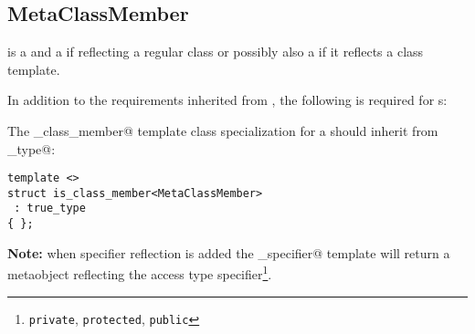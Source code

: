 \subsection{MetaClassMember}
\label{concept-MetaClassMember}

 is a  and a  if reflecting a regular class or possibly
also a  if it reflects a class template.

In addition to the requirements inherited from ,
the following is required for s:

The \verb@is_class_member@ template class specialization for a  should
inherit from \verb@true_type@:

\begin{verbatim}
template <>
struct is_class_member<MetaClassMember>
 : true_type
{ };
\end{verbatim}

\textbf{Note:} when specifier reflection is added the \verb@access_specifier@
template will return a metaobject reflecting the access type
specifier\footnote{\texttt{private}, \texttt{protected}, \texttt{public}}.

